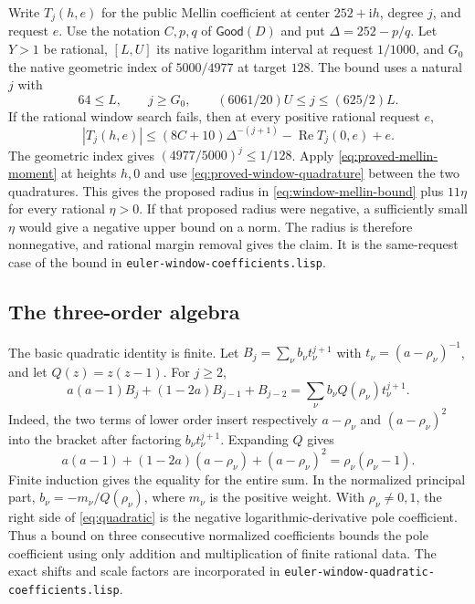 \documentclass[11pt]{amsart}
\theoremstyle{definition}
\theoremstyle{remark}
\numberwithin{equation}{section}
\newcommand{\Good}{\mathsf{Good}}
\newcommand{\re}{\operatorname{Re}}
\newcommand{\code}[1]{\nolinkurl{#1}}
\begin{document}
Write \(T_j(h,e)\) for the public Mellin coefficient at
center \(252+\mathrm i h\), degree \(j\), and request \(e\).
Use the notation \(C,p,q\) of \(\Good(D)\) and put
\(\Delta=252-p/q\).
Let \(Y>1\) be rational, \([L,U]\) its native logarithm
interval at request \(1/1000\), and \(G_0\) the native
geometric index of \(5000/4977\) at target \(128\).
The bound uses a natural \(j\) with
\begin{equation}\label{eq:window-band}
     64\le L,\qquad j\ge G_0,\qquad
                   (6061/20)U\le j\le (625/2)L .
\end{equation}
If the rational window search fails, then at every
positive rational request \(e\),
\begin{equation}\label{eq:window-mellin-bound}
      |T_j(h,e)|
       \le (8C+10)\Delta^{-(j+1)}-\re T_j(0,e)+e .
\end{equation}
The geometric index gives \((4977/5000)^j\le1/128\).
Apply \eqref{eq:proved-mellin-moment} at heights \(h,0\)
and use \eqref{eq:proved-window-quadrature} between the
two quadratures. This gives the proposed radius in
\eqref{eq:window-mellin-bound} plus \(11\eta\) for every
rational \(\eta>0\). If that proposed radius were negative,
a sufficiently small \(\eta\) would give a negative upper bound
on a norm. The radius is therefore nonnegative, and rational
margin removal gives the claim. It is the same-request case of the
bound in \code{euler-window-coefficients.lisp}.

\subsection{The three-order algebra}

The basic quadratic identity is finite. Let
$B_j=\sum_\nu b_\nu t_\nu^{j+1}$ with $t_\nu=(a-\rho_\nu)^{-1}$,
and let $Q(z)=z(z-1)$. For $j\ge2$,
\begin{equation}\label{eq:quadratic}
 a(a-1)B_j+(1-2a)B_{j-1}+B_{j-2}
   =\sum_\nu b_\nu Q(\rho_\nu)t_\nu^{j+1}.
\end{equation}
Indeed, the two terms of lower order insert respectively
$a-\rho_\nu$ and $(a-\rho_\nu)^2$ into the bracket after
factoring $b_\nu t_\nu^{j+1}$. Expanding $Q$ gives
\[
 a(a-1)+(1-2a)(a-\rho_\nu)+(a-\rho_\nu)^2
      =\rho_\nu(\rho_\nu-1).
\]
Finite induction gives the equality for the entire sum.
In the normalized principal part, $b_\nu=-m_\nu/Q(\rho_\nu)$,
where $m_\nu$ is the positive weight. With $\rho_\nu\ne0,1$,
the right side of \eqref{eq:quadratic} is the negative
logarithmic-derivative pole coefficient. Thus a bound on three
consecutive normalized coefficients bounds the pole coefficient
using only addition and multiplication of finite rational data.
The exact shifts and scale factors are incorporated in
\code{euler-window-quadratic-coefficients.lisp}.
\end{document}
